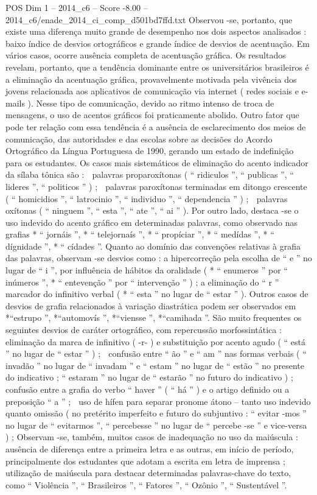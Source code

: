\begin{textsample}{POS Dim 1 – 2014\_c6 – Score -8.00 – 2014\_c6/enade\_2014\_ci\_comp\_d501bd7ffd.txt}
Observou -se, portanto, que existe uma diferença muito grande de desempenho nos dois aspectos analisados : baixo índice de desvios ortográficos e grande índice de desvios de acentuação.
Em vários casos, ocorre ausência completa de acentuação gráfica.
Os resultados revelam, portanto, que a tendência dominante entre os universitários brasileiros é a eliminação da acentuação gráfica, provavelmente motivada pela vivência dos jovens relacionada aos aplicativos de comunicação via internet ( redes sociais e e-mails ).
Nesse tipo de comunicação, devido ao ritmo intenso de troca de mensagens, o uso de acentos gráficos foi praticamente abolido.
Outro fator que pode ter relação com essa tendência é a ausência de esclarecimento dos meios de comunicação, das autoridades e das escolas sobre as decisões do Acordo Ortográfico da Língua Portuguesa de 1990, gerando um estado de indefinição para os estudantes.
Os casos mais sistemáticos de eliminação do acento indicador da sílaba tônica são :  palavras proparoxítonas ( “ ridiculos ”, “ publicas ”, “ lideres ”, “ politicos ” ) ;  palavras paroxítonas terminadas em ditongo crescente ( “ homicidios ”, “ latrocinio ”, “ individuo ”, “ dependencia ” ) ;  palavras oxítonas ( “ ninguem ”, “ esta ”, “ ate ”, “ ai ” ).
Por outro lado, destaca -se o uso indevido do acento gráfico em determinadas palavras, como observado nas grafias * “ jornáis ”, * “ telejornaís ”, * “ propíciar ”, * “ medídas ”, * “ dígnidade ”, * “ cídades ”.
Quanto ao domínio das convenções relativas à grafia das palavras, observam -se desvios como : a hipercorreção pela escolha de “ e ” no lugar de “ i ”, por influência de hábitos da oralidade ( * “ enumeros ” por “ inúmeros ”, * “ entevenção ” por “ intervenção ” ) ; a eliminação do “ r ” marcador do infinitivo verbal ( * “ esta ” no lugar de “ estar ” ).
Outros casos de desvios de grafia relacionados à variação diastrática podem ser observados em *“estrupo ”, *“automovís ”, *“viensse ”, *“camihada ”.
São muito frequentes os seguintes desvios de caráter ortográfico, com repercussão morfossintática :  eliminação da marca de infinitivo ( -r- ) e substituição por acento agudo ( “ está ” no lugar de “ estar ” ) ;  confusão entre “ ão ” e “ am ” nas formas verbais ( “ invadão ” no lugar de “ invadam ” e “ estam ” no lugar de “ estão ” no presente do indicativo ; “ estaram ” no lugar de “ estarão ” no futuro do indicativo ) ;  confusão entre a grafia do verbo “ haver ” ( “ há ” ) e o artigo definido ou a preposição “ a ” ;  uso de hífen para separar pronome átono – tanto uso indevido quanto omissão ( no pretérito imperfeito e futuro do subjuntivo : “ evitar -mos ” no lugar de “ evitarmos ”, “ percebesse ” no lugar de “ percebe -se ” e vice-versa ) ; Observam -se, também, muitos casos de inadequação no uso da maiúscula : ausência de diferença entre a primeira letra e as outras, em início de período, principalmente dos estudantes que adotam a escrita em letra de imprensa ; utilização de maiúscula para destacar determinadas palavras-chave do texto, como “ Violência ”, “ Brasileiros ”, “ Fatores ”, “ Ozônio ”, “ Sustentável ”.

\end{textsample}
